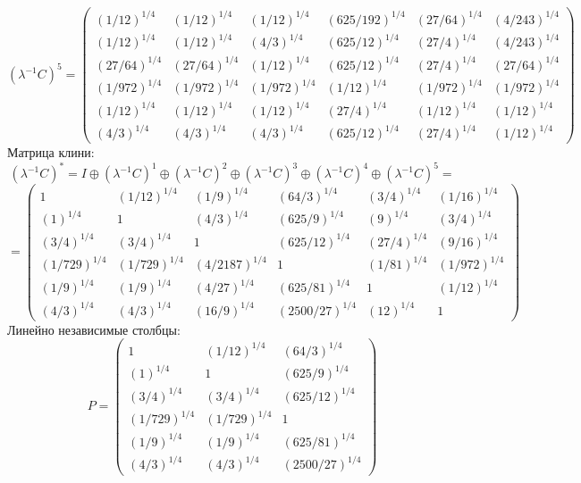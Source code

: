 $$(\lambda^{-1}C)^5 = \begin{pmatrix}
(1/12)^{1/4} & (1/12)^{1/4} & (1/12)^{1/4} & (625/192)^{1/4} & (27/64)^{1/4} & (4/243)^{1/4}\\
(1/12)^{1/4} & (1/12)^{1/4} & (4/3)^{1/4} & (625/12)^{1/4} & (27/4)^{1/4} & (4/243)^{1/4}\\
(27/64)^{1/4} & (27/64)^{1/4} & (1/12)^{1/4} & (625/12)^{1/4} & (27/4)^{1/4} & (27/64)^{1/4}\\
(1/972)^{1/4} & (1/972)^{1/4} & (1/972)^{1/4} & (1/12)^{1/4} & (1/972)^{1/4} & (1/972)^{1/4}\\
(1/12)^{1/4} & (1/12)^{1/4} & (1/12)^{1/4} & (27/4)^{1/4} & (1/12)^{1/4} & (1/12)^{1/4}\\
(4/3)^{1/4} & (4/3)^{1/4} & (4/3)^{1/4} & (625/12)^{1/4} & (27/4)^{1/4} & (1/12)^{1/4}
\end{pmatrix}
$$
Матрица клини:
$$(\lambda^{-1}C)^* = I \oplus (\lambda^{-1}C)^1 \oplus (\lambda^{-1}C)^2 \oplus (\lambda^{-1}C)^3 \oplus (\lambda^{-1}C)^4 \oplus (\lambda^{-1}C)^5 = $$
$$ = \begin{pmatrix}
1 & (1/12)^{1/4} & (1/9)^{1/4} & (64/3)^{1/4} & (3/4)^{1/4} & (1/16)^{1/4}\\
(1)^{1/4} & 1 & (4/3)^{1/4} & (625/9)^{1/4} & (9)^{1/4} & (3/4)^{1/4}\\
(3/4)^{1/4} & (3/4)^{1/4} & 1 & (625/12)^{1/4} & (27/4)^{1/4} & (9/16)^{1/4}\\
(1/729)^{1/4} & (1/729)^{1/4} & (4/2187)^{1/4} & 1 & (1/81)^{1/4} & (1/972)^{1/4}\\
(1/9)^{1/4} & (1/9)^{1/4} & (4/27)^{1/4} & (625/81)^{1/4} & 1 & (1/12)^{1/4}\\
(4/3)^{1/4} & (4/3)^{1/4} & (16/9)^{1/4} & (2500/27)^{1/4} & (12)^{1/4} & 1
\end{pmatrix}
$$
Линейно независимые столбцы:
$$P = \begin{pmatrix}
1 & (1/12)^{1/4} & (64/3)^{1/4}\\
(1)^{1/4} & 1 & (625/9)^{1/4}\\
(3/4)^{1/4} & (3/4)^{1/4} & (625/12)^{1/4}\\
(1/729)^{1/4} & (1/729)^{1/4} & 1\\
(1/9)^{1/4} & (1/9)^{1/4} & (625/81)^{1/4}\\
(4/3)^{1/4} & (4/3)^{1/4} & (2500/27)^{1/4}
\end{pmatrix}
$$

